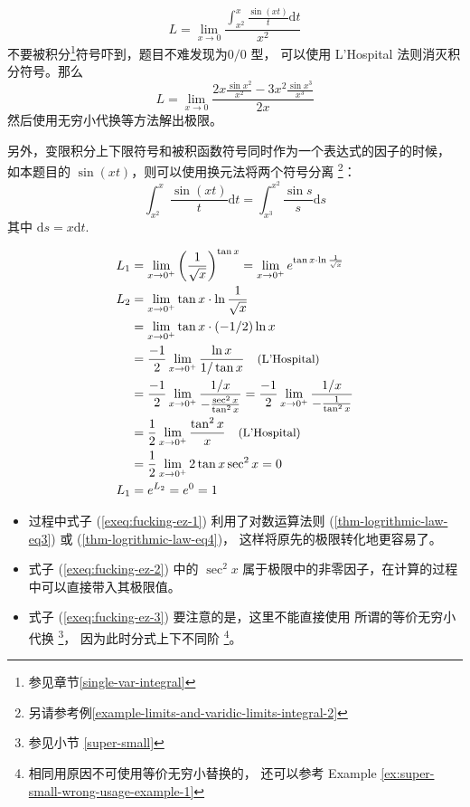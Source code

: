 \begin{example}
    \label{example-limits-and-varidic-limits-integral-1}
    \[
        L = \lim_{x \to 0} 
        \frac{\int_{x^2}^{x} \frac{\sin (xt)}{t} \mathrm dt }{x^2}
    \]
    不要被积分\footnote{参见章节\ref{single-var-integral}}符号吓到，题目不难发现为$0/0$ 型，
    可以使用 L'Hospital 法则消灭积分符号。那么
    \[
        L = \lim_{x \to 0} \frac{2x \frac{\sin x^2}{x^2} - 3x^2 \frac{\sin x^3}{x^3}}{2x}
    \]
    然后使用无穷小代换等方法解出极限。

    另外，变限积分上下限符号和被积函数符号同时作为一个表达式的因子的时候，
    如本题目的 $\sin (xt)$，则可以使用换元法将两个符号分离
    \footnote{另请参考例\ref{example-limits-and-varidic-limits-integral-2}}：
    \[
        \int_{x^2}^{x}   \frac{\sin (xt)}{t}\mathrm dt  = 
        \int_{x^3}^{x^2} \frac{\sin s}{s}   \mathrm ds
    \]
    其中 $\mathrm ds = x \mathrm dt$.
\end{example}

\begin{example}
    \label{ex:fucking-ez-limit-but-I-dont-know-how-to-evaluate}
    \begin{align}
        \notag L_1 &= \lim_{x \to 0^+} \left(\frac{1}{\sqrt{x}}\right)^{\tan x} = \lim_{x \to 0^+} e^{\tan x \cdot \ln \frac{1}{\sqrt{x}}}\\
        \label{exeq:fucking-ez-1} L_2 &= \lim_{x \to 0^+} \tan x \cdot \ln \frac{1}{\sqrt{x}} \\
        \notag     &= \lim_{x \to 0^+} \tan x \cdot (-1/2) \ln x\\
        \notag     &= \frac{-1}{2} \lim_{x \to 0^+} \frac{\ln x}{1/ \tan x} \quad \mbox{\small (L'Hospital)}\\ 
        \label{exeq:fucking-ez-2} &= \frac{-1}{2} \lim_{x \to 0^+} \frac{1/x}{-\frac{\sec^2 x}{\tan^2 x}} = \frac{-1}{2} \lim_{x \to 0^+} \frac{1/x}{-\frac{1}{\tan^2 x}} \\
        \label{exeq:fucking-ez-3} &= \frac{1}{2}  \lim_{x \to 0^+} \frac{\tan^2 x}{x} \quad \mbox{\small (L'Hospital)}\\ 
        \notag     &= \frac{1}{2}  \lim_{x \to 0^+} 2 \tan x \sec^2 x = 0 \\
        \notag L_1 &= e^{L_2} = e^0 = 1
    \end{align}

    \begin{itemize}
        \item 过程中式子 (\ref{exeq:fucking-ez-1}) 利用了对数运算法则 (\ref{thm-logrithmic-law-eq3}) 或 (\ref{thm-logrithmic-law-eq4})，
            这样将原先的极限转化地更容易了。
        \item 式子 (\ref{exeq:fucking-ez-2}) 中的 $\sec^2 x$ 属于极限中的非零因子，在计算的过程中可以直接带入其极限值。
        \item 式子 (\ref{exeq:fucking-ez-3}) 要注意的是，这里不能直接使用
            所谓的等价无穷小代换
            \footnote{参见小节 \ref{super-small}}，
            因为此时分式上下不同阶
            \footnote{
                相同用原因不可使用等价无穷小替换的，
                还可以参考 Example 
                \ref{ex:super-small-wrong-usage-example-1}
            }。
    \end{itemize}
\end{example}

